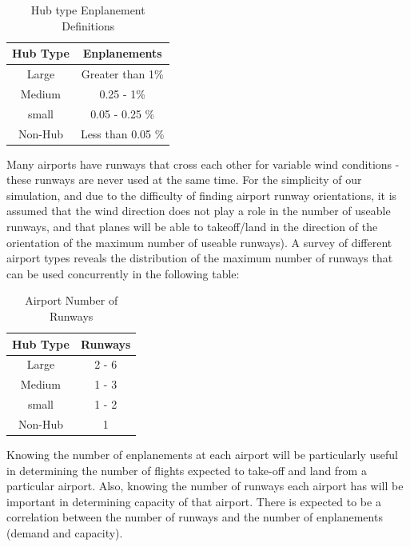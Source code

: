 \begin{table}[h]
\begin{center}
\addtolength{\tabcolsep}{-0pt}
\caption{Hub type Enplanement Definitions}
\label{table:airport_size}
\begin{tabular}{|c|c|}\hline

Hub Type & Enplanements  \\\hline
Large & Greater than 1\%  \\\hline
Medium & 0.25 - 1\%  \\\hline
small & 0.05 - 0.25 \% \\\hline
Non-Hub & Less than 0.05 \%  \\\hline

\end{tabular}
\end{center}
\end{table}

Many airports have runways that cross each other for variable wind conditions - these runways
are never used at the same time. For the simplicity of our simulation, and due to the difficulty of
finding airport runway orientations, it is assumed that the wind direction does not play a role in
the number of useable runways, and that planes will be able to takeoff/land in the direction of
the orientation of the maximum number of useable runways). A survey of different airport types
reveals the distribution of the maximum number of runways that can be used concurrently in the following table:

\begin{table}[htb]
\begin{center}
\addtolength{\tabcolsep}{-0pt}
\caption{Airport Number of Runways}
\label{table:airport_runway}
\begin{tabular}{|c|c|}\hline

Hub Type & Runways  \\\hline
Large & 2 - 6  \\\hline
Medium & 1 - 3  \\\hline
small & 1 - 2 \\\hline
Non-Hub & 1  \\\hline

\end{tabular}
\end{center}
\end{table}


Knowing the number of enplanements at each airport will be particularly useful in determining
the number of flights expected to take-off and land from a particular airport. Also, knowing the
number of runways each airport has will be important in determining capacity of that airport.
There is expected to be a correlation between the number of runways and the number of
enplanements (demand and capacity).

